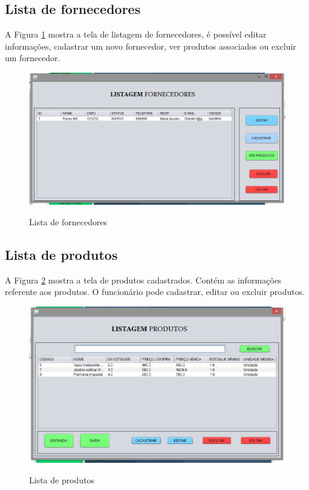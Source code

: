\subsection{Lista de fornecedores}
A Figura \ref{fig:Lista-de-fornecedores} mostra a tela de listagem de fornecedores, é possível editar informações, cadastrar um novo fornecedor, ver produtos associados ou excluir um fornecedor.
\begin{figure}[H]
\centering
\caption{Lista de fornecedores}
\includegraphics[width=14cm]{imagens/telas/ListaFornecedor}
\label{fig:Lista-de-fornecedores}
\end{figure}
       
\subsection{Lista de produtos}

A Figura \ref{fig:Lista-de-produtos} mostra a tela de produtos cadastrados. Contém as informações referente aos produtos. O funcionário pode cadastrar, editar ou excluir produtos.
\begin{figure}[H]
\centering
\caption{Lista de produtos}
\includegraphics[width=14cm]{imagens/telas/ListaProdutos}
\label{fig:Lista-de-produtos}
\end{figure}
        
